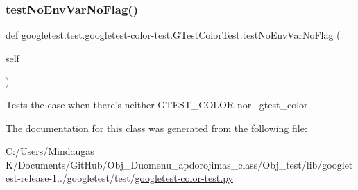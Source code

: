 \subsubsection{\texorpdfstring{testNoEnvVarNoFlag()}{testNoEnvVarNoFlag()}}
{\footnotesize\ttfamily def googletest.\+test.\+googletest-\/color-\/test.\+G\+Test\+Color\+Test.\+test\+No\+Env\+Var\+No\+Flag (\begin{DoxyParamCaption}\item[{}]{self }\end{DoxyParamCaption})}

\begin{DoxyVerb}Tests the case when there's neither GTEST_COLOR nor --gtest_color.\end{DoxyVerb}
 

The documentation for this class was generated from the following file\+:\begin{DoxyCompactItemize}
\item 
C\+:/\+Users/\+Mindaugas K/\+Documents/\+Git\+Hub/\+Obj\+\_\+\+Duomenu\+\_\+apdorojimas\+\_\+class/\+Obj\+\_\+test/lib/googletest-\/release-\/1../googletest/test/\mbox{\hyperlink{_obj__test_2lib_2googletest-release-1_88_81_2googletest_2test_2googletest-color-test_8py}{googletest-\/color-\/test.\+py}}\end{DoxyCompactItemize}
